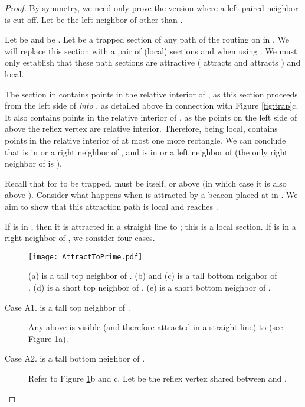 \documentclass{article}
\begin{document}
	\begin{proof}
		By symmetry, we need only prove the version where a left paired neighbor is cut
		off.  Let  be the left neighbor of  other than .
		
		Let  be  and  be .
		Let  be a trapped section of any path of the routing on 
		in .
		We will replace this section with a pair of (local) sections  and
		 when using .
		We must only establish that these path sections are attractive ( attracts
		 and  attracts ) and local.
		
		The section  in  contains points in the relative interior
		of , as this section proceeds from the left side of  \emph{into} ,
		as detailed above in connection with Figure \ref{fig:trap}c.
		It also contains points in the relative interior of , as the points on
		the left side of  above the reflex vertex are relative interior.
		Therefore, being local,  contains points in the relative interior
		of at most one more rectangle.
		We can conclude that  is in  or a right neighbor of ,
		and  is in  or a left neighbor of  (the only right neighbor of 
		is ).
		
		Recall that for  to be trapped,  must be  itself, or
		above  (in which case it is also above ).
		Consider what happens when  is attracted by a beacon placed at 
		in .  We aim to show that this attraction path is local and reaches
		.
		
		If  is in , then it is attracted in a straight
		line to ; this is a local section.
		If  is in a right neighbor  of , we consider four cases.
		
		\begin{figure}[p] 
		   \begin{center}
		      \texttt{[image: AttractToPrime.pdf]} 
		   \end{center}
		   \caption{
		     (a)  is a tall top neighbor of . 
		     (b) and (c)  is a tall bottom neighbor of .
		     (d)  is a short top neighbor of .
		     (e)  is a short bottom neighbor of .
		   }
		   \label{fig:attracttoprime}
		\end{figure}
		
		\begin{description}
		\item[Case A1.   is a tall top neighbor of .]
			Any  above  is visible
			(and therefore attracted in a straight line) to  (see Figure
			\ref{fig:attracttoprime}a).
		
		\item[Case A2.  is a tall bottom neighbor of .]
			Refer to Figure \ref{fig:attracttoprime}b and c.
			Let  be the reflex vertex shared between  and .


\end{description}
\end{proof}
\end{document}
